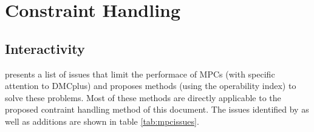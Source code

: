 \chapter{Constraint Handling}\label{chap:conhand}
\begin{overview}
\end{overview}

\section{Interactivity}
\citet{vinsonphd} presents a list of issues that limit the performace of MPCs
(with specific attention to DMCplus) and proposes methods (using the 
operability index) to solve these problems. Most of these methods are directly
applicable to the proposed contraint handling method of this document. The
issues identified by \citet{vinsonphd} as well as additions are shown in table
\ref{tab:mpcissues}.
